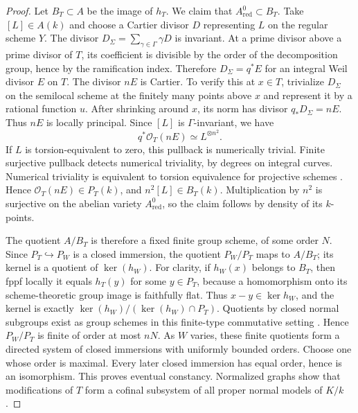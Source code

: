 \begin{proof}
Let $B_T\subset A$ be the image of $h_T$.  We claim that
$A_{\mathrm{red}}^0\subset B_T$.  Take $[L]\in A(k)$ and choose
a Cartier divisor $D$ representing $L$ on the regular scheme $Y$.
The divisor $D_\Sigma=\sum_{\gamma\in\Gamma}\gamma D$ is invariant.
At a prime divisor above a prime divisor of $T$, its coefficient is
divisible by the order of the decomposition group, hence by the
ramification index.  Therefore $D_\Sigma=q^*E$ for an integral Weil
divisor $E$ on $T$.  The divisor $nE$ is Cartier.  To verify this at
$x\in T$, trivialize $D_\Sigma$ on the semilocal scheme at the
finitely many points above $x$ and represent it by a rational
function $u$.  After shrinking around $x$, its norm has divisor
$q_*D_\Sigma=nE$.  Thus $nE$ is locally principal.
Since $[L]$ is $\Gamma$-invariant, we have
\[
 q^*\mathcal O_T(nE)\simeq L^{\otimes n^2}.
\]
If $L$ is torsion-equivalent to zero, this pullback is numerically
trivial.  Finite surjective pullback detects numerical triviality,
by degrees on integral curves.  Numerical triviality is equivalent
to torsion equivalence for projective schemes
\cite[Theorem 6.3]{Kleiman2005}.  Hence
$\mathcal O_T(nE)\in P_T(k)$, and $n^2[L]\in B_T(k)$.
Multiplication by $n^2$ is surjective on the abelian variety
$A_{\mathrm{red}}^0$, so the claim follows by density of its $k$-points.

The quotient $A/B_T$ is therefore a fixed finite group scheme, of
some order $N$.  Since $P_T\hookrightarrow P_W$ is a closed immersion,
the quotient $P_W/P_T$ maps to $A/B_T$; its kernel is a quotient
of $\ker(h_W)$.  For clarity, if $h_W(x)$ belongs to $B_T$, then
fppf locally it equals $h_T(y)$ for some $y\in P_T$, because a
homomorphism onto its scheme-theoretic group image is faithfully flat.
Thus $x-y\in\ker h_W$, and the kernel is exactly
$\ker(h_W)/(\ker(h_W)\cap P_T)$.  Quotients by closed normal
subgroups exist as group schemes in this finite-type commutative
setting \cite[Theorems 5.14, 5.28 and 5.39]{MilneAG2022B}.  Hence $P_W/P_T$ is finite of order at most $nN$.
As $W$ varies, these finite quotients form a directed system of
closed immersions with uniformly bounded orders.  Choose one whose
order is maximal.  Every later closed immersion has equal order,
hence is an isomorphism.  This proves eventual constancy.  Normalized
graphs show that modifications of $T$ form a cofinal subsystem of
all proper normal models of $K/k$.
\end{proof}

